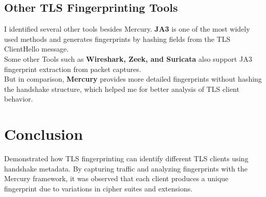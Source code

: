 \documentclass[12pt]{article}
\begin{document}
\subsection*{Other TLS Fingerprinting Tools}

I identified several other tools besides Mercury. 
\textbf{JA3} is one of the most widely used methods and generates fingerprints by 
hashing fields from the TLS ClientHello message. \\
Some other Tools such as \textbf{Wireshark, Zeek, and Suricata} also support JA3 fingerprint extraction from packet captures. \\
But in comparison, \textbf{Mercury} provides more detailed fingerprints without hashing the handshake structure, which helped me for better analysis of TLS client behavior.

\section*{Conclusion}

Demonstrated how TLS fingerprinting can identify different TLS clients using handshake metadata. By capturing traffic and analyzing fingerprints with the Mercury framework, it was observed that each client produces a unique fingerprint due to variations in cipher suites and extensions.
\end{document}
